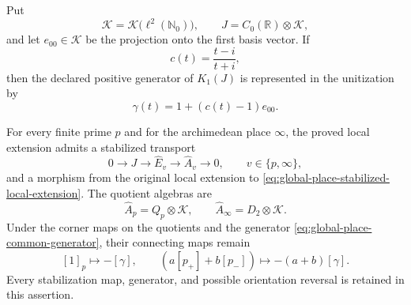 Put
\[
 \mathcal K=\mathcal K\bigl(\ell^2(\mathbb N_0)\bigr),
 \qquad J=C_0(\mathbb R)\otimes\mathcal K,
\]
and let $e_{00}\in\mathcal K$ be the projection onto the first basis vector.
If
\[
 c(t)=\frac{t-i}{t+i},
\]
then the declared positive generator of $K_1(J)$ is represented in the
unitization by
\begin{equation}
 \gamma(t)=1+(c(t)-1)e_{00}.
 \label{eq:global-place-common-generator}
\end{equation}

\begin{lemma}
\label{lem:global-place-common-stabilization}
For every finite prime $p$ and for the archimedean place $\infty$, the proved
local extension admits a stabilized transport
\begin{equation}
 0\longrightarrow J\longrightarrow\widehat E_v
 \longrightarrow\widehat A_v\longrightarrow0,
 \qquad v\in\{p,\infty\},
 \label{eq:global-place-stabilized-local-extension}
\end{equation}
and a morphism from the original local extension to
\eqref{eq:global-place-stabilized-local-extension}.  The quotient algebras are
\[
 \widehat A_p=Q_p\otimes\mathcal K,
 \qquad
 \widehat A_\infty=D_2\otimes\mathcal K.
\]
Under the corner maps on the quotients and the generator
\eqref{eq:global-place-common-generator}, their connecting maps remain
\[
 [1]_p\longmapsto-[\gamma],
 \qquad
 (a[p_+]+b[p_-])\longmapsto-(a+b)[\gamma].
\]
Every stabilization map, generator, and possible orientation reversal is
retained in this assertion.
\end{lemma}

